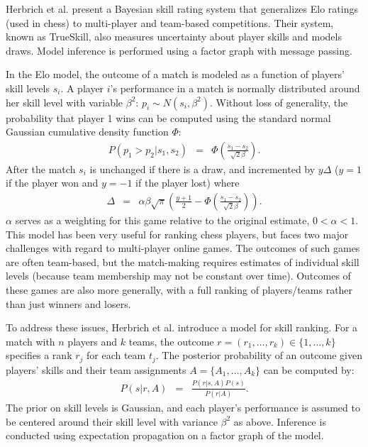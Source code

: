 \documentclass[12pt,letterpaper]{article}
\begin{document}
Herbrich et al. present a Bayesian skill rating system that generalizes Elo ratings (used in chess) to multi-player and team-based competitions. Their system, known as TrueSkill, also measures uncertainty about player skills and models draws. Model inference is performed using a factor graph with message passing. 

In the Elo model, the outcome of a match is modeled as a function of players' skill levels $s_i$. A player $i$'s performance in a match is normally distributed around her skill level with variable $\beta^2$: $p_i \sim N(s_i, \beta^2)$. Without loss of generality, the probability that player 1 wins can be computed using the standard normal Gaussian cumulative density function $\Phi$:
\begin{eqnarray*}
P(p_1 > p_2 | s_1, s_2) &=& \Phi(\frac{s_1 - s_2}{ \sqrt{2} \beta }).
\end{eqnarray*}
After the match $s_i$ is unchanged if there is a draw, and incremented by $y \Delta$ ($y=1$ if the player won and $y=-1$ if the player lost) where
\begin{eqnarray*}
\Delta &=& \alpha \beta \sqrt{\pi} ( \frac{y+1}{2} - \Phi(\frac{s_1 - s_2}{ \sqrt{2} \beta }) ).
\end{eqnarray*}
$\alpha$ serves as a weighting for this game relative to the original estimate, $0 < \alpha < 1$. This model has been very useful for ranking chess players, but faces two major challenges with regard to multi-player online games. The outcomes of such games are often team-based, but the match-making requires estimates of individual skill levels (because team membership may not be constant over time). Outcomes of these games are also more generally, with a full ranking of players/teams rather than just winners and losers. 

To address these issues, Herbrich et al. introduce a model for skill ranking. For a match with $n$ players and $k$ teams, the outcome $r = (r_1, \ldots, r_k) \in \{1, \ldots, k\}$ specifies a rank $r_j$ for each team $t_j$. The posterior probability of an outcome given players' skills and their team assignments $A=\{A_1, \ldots, A_k \}$ can be computed by:
\begin{eqnarray*}
P(s|r, A) &=& \frac{P(r|s, A) P(s)}{P(r|A)}.
\end{eqnarray*}
The prior on skill levels is Gaussian, and each player's performance is assumed to be centered around their skill level with variance $\beta^2$ as above. Inference is conducted using expectation propagation on a factor graph of the model.
\end{document}
